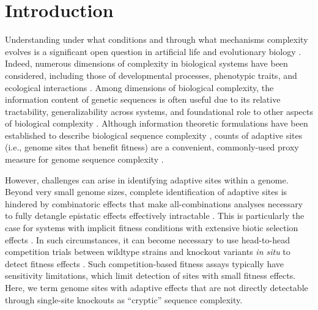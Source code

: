 \section{Introduction} \label{sec:introduction}

Understanding under what conditions and through what mechanisms complexity evolves is a significant open question in artificial life and evolutionary biology \citep{taylor2016open,pigliucci2009extended}.
Indeed, numerous dimensions of complexity in biological systems have been considered, including those of developmental processes, phenotypic traits, and ecological interactions \citep{szathmary2001can,mcshea2000functional}.
Among dimensions of biological complexity, the information content of genetic sequences is often useful due to its relative tractability, generalizability across systems, and foundational role to other aspects of biological complexity \citep{adami2002complexity}.
Although information theoretic formulations have been established to describe biological sequence complexity \citep{weiss2000information}, counts of adaptive sites (i.e., genome sites that benefit fitness) are a convenient, commonly-used proxy measure for genome sequence complexity \citep{dolson2019modes}.

However, challenges can arise in identifying adaptive sites within a genome.
Beyond very small genome sizes, complete identification of adaptive sites is hindered by combinatoric effects that make all-combinations analyses necessary to fully detangle epistatic effects effectively intractable \citep{nitash2021information,adami2000evolution}.
This is particularly the case for systems with implicit fitness conditions with extensive biotic selection effects \citep{moreno2022exploring,channon2000towards}.
In such circumstances, it can become necessary to use head-to-head competition trials between wildtype strains and knockout variants \textit{in situ} to detect fitness effects \citep{moreno2021case}.
Such competition-based fitness assays typically have sensitivity limitations, which limit detection of sites with small fitness effects.
Here, we term genome sites with adaptive effects that are not directly detectable through single-site knockouts as ``cryptic'' sequence complexity.



